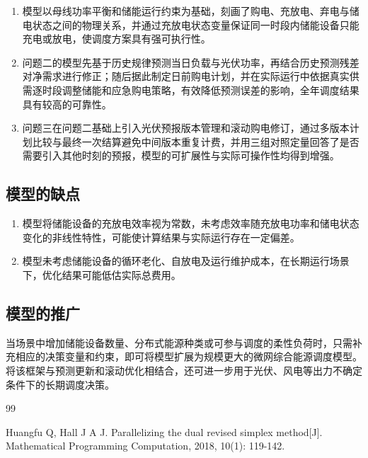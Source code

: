 \documentclass[12pt,a4paper]{ctexart}
\theoremstyle{definition}
\theoremstyle{plain}
\theoremstyle{remark}
\begin{document}
\begin{enumerate}[label=\arabic*.]
\item 模型以母线功率平衡和储能运行约束为基础，刻画了购电、充放电、弃电与储电状态之间的物理关系，并通过充放电状态变量保证同一时段内储能设备只能充电或放电，使调度方案具有强可执行性。
\item 问题二的模型先基于历史规律预测当日负载与光伏功率，再结合历史预测残差对净需求进行修正；随后据此制定日前购电计划，并在实际运行中依据真实供需逐时段调整储能和应急购电策略，有效降低预测误差的影响，全年调度结果具有较高的可靠性。
\item 问题三在问题二基础上引入光伏预报版本管理和滚动购电修订，通过多版本计划比较与最终一次结算避免中间版本重复计费，并用三组对照定量回答了是否需要引入其他时刻的预报，模型的可扩展性与实际可操作性均得到增强。
\end{enumerate}

\subsection{模型的缺点}

\begin{enumerate}[label=\arabic*.]
  \item 模型将储能设备的充放电效率视为常数，未考虑效率随充放电功率和储电状态变化的非线性特性，可能使计算结果与实际运行存在一定偏差。
  \item 模型未考虑储能设备的循环老化、自放电及运行维护成本，在长期运行场景下，优化结果可能低估实际总费用。
\end{enumerate}

\subsection{模型的推广}

当场景中增加储能设备数量、分布式能源种类或可参与调度的柔性负荷时，只需补充相应的决策变量和约束，即可将模型扩展为规模更大的微网综合能源调度模型。将该框架与预测更新和滚动优化相结合，还可进一步用于光伏、风电等出力不确定条件下的长期调度决策。


\newpage
\begin{thebibliography}{99}

 Huangfu Q, Hall J A J. Parallelizing the dual revised simplex method[J]. Mathematical Programming Computation, 2018, 10(1): 119-142.

\end{thebibliography}
\end{document}
